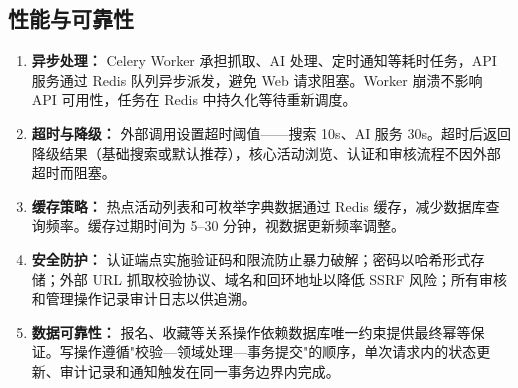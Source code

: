 \documentclass[12pt,a4paper]{ctexart}
\begin{document}
\subsection{性能与可靠性}
\begin{enumerate}
\item \textbf{异步处理：} Celery Worker 承担抓取、AI 处理、定时通知等耗时任务，API 服务通过 Redis 队列异步派发，避免 Web 请求阻塞。Worker 崩溃不影响 API 可用性，任务在 Redis 中持久化等待重新调度。
\item \textbf{超时与降级：} 外部调用设置超时阈值——搜索 10s、AI 服务 30s。超时后返回降级结果（基础搜索或默认推荐），核心活动浏览、认证和审核流程不因外部超时而阻塞。
\item \textbf{缓存策略：} 热点活动列表和可枚举字典数据通过 Redis 缓存，减少数据库查询频率。缓存过期时间为 5--30 分钟，视数据更新频率调整。
\item \textbf{安全防护：} 认证端点实施验证码和限流防止暴力破解；密码以哈希形式存储；外部 URL 抓取校验协议、域名和回环地址以降低 SSRF 风险；所有审核和管理操作记录审计日志以供追溯。
\item \textbf{数据可靠性：} 报名、收藏等关系操作依赖数据库唯一约束提供最终幂等保证。写操作遵循"校验—领域处理—事务提交"的顺序，单次请求内的状态更新、审计记录和通知触发在同一事务边界内完成。
\end{enumerate}
\end{document}
